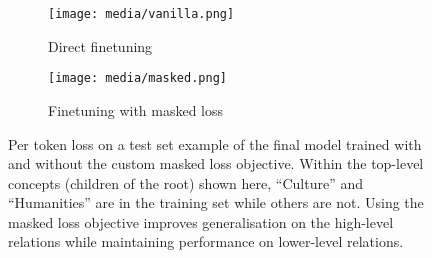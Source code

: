 \begin{figure}[t]
\vspace*{-2mm}  
    \centering
    \begin{subfigure}[c]{\textwidth}
        \centering
        \texttt{[image: media/vanilla.png]}
        
        \vspace*{-1mm}
        \caption{Direct finetuning}
    \end{subfigure}%
    \hfill
    \begin{subfigure}[c]{\textwidth}
        \centering
        \texttt{[image: media/masked.png]}
        
        \vspace*{-1mm}  
        \caption{Finetuning with masked loss}
    \end{subfigure}%
    \caption{Per token loss on a test set example of the final model trained with and without the custom masked loss objective. Within the top-level concepts (children of the root) shown here, ``Culture'' and ``Humanities'' are in the training set while others are not. Using the masked loss objective improves generalisation on the high-level relations while maintaining performance on lower-level relations.}
    \label{fig:vanilla-vs-mask}
    \vspace*{-2mm}  
\end{figure}